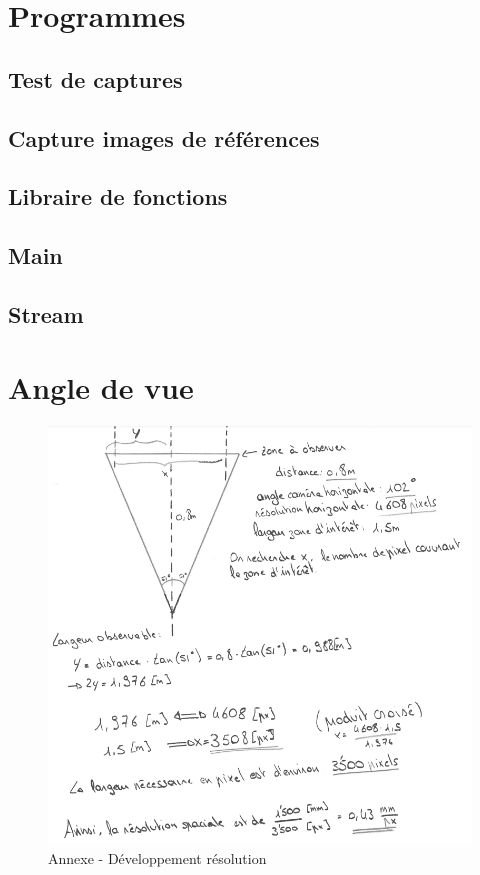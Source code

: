 \documentclass[
    iai, %
    eai, %
]{heig-tb}
\begin{document}
\chapter{Programmes}

\section{Test de captures \label{test_process}}

\section{Capture images de références \label{img_ref}}


\section{Libraire de fonctions \label{libraire_det}}


\section{Main \label{main}}


\section{Stream \label{stream}}


\chapter{Angle de vue \label{dev_pxl}}
\begin{figure}[H]
    \centering
    \includegraphics[width=\textwidth]{assets/figures/developpement_resolution.PNG}
    \caption{Annexe - Développement résolution}
\end{figure}
\end{document}
